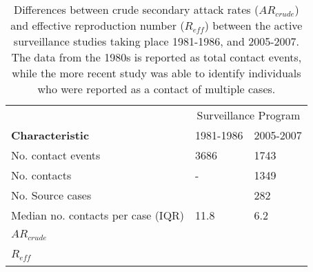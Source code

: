 \begin{table} %
\centering %
\caption{Differences between crude secondary attack rates ($AR_{crude}$) and effective reproduction number ($R_{eff}$) between the active surveillance studies taking place 1981-1986, and 2005-2007. The data from the 1980s is reported as total contact events, while the more recent study was able to identify individuals who were reported as a contact of multiple cases.} %
\begin{tabular}{p{7cm} p{3cm} p{3cm}} %
\toprule %
& \multicolumn{2}{c}{Surveillance Program} \\ %
\cmidrule(l){2-3} %
\textbf{Characteristic} & 1981-1986 & 2005-2007 \\ %
\midrule %
No. contact events & 3686 & 1743 \\ %
No. contacts & - & 1349 \\ %
No. Source cases & ~ & 282 \\ %
Median no. contacts per case (IQR) & 11.8 & 6.2 \\ %
$AR_{crude}$ & ~ & ~ \\ %
$R_{eff}$ & ~ & ~ \\
\bottomrule %
\end{tabular}
\end{table}